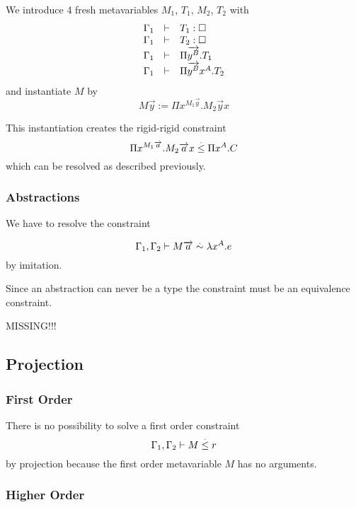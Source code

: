 We introduce 4 fresh metavariables $M_1$, $T_1$, $M_2$, $T_2$ with
$$
    \begin{array}{lllll} 
        \Gamma_1 &\vdash& T_1: {\Box}
        \\
        \Gamma_1 &\vdash& T_2: {\Box}
        \\
        \Gamma_1 &\vdash& \Pi {\overrightarrow {y^B}}. T_1
        \\
        \Gamma_1 &\vdash& \Pi {\overrightarrow {y^B}} x^A. T_2
     \end{array}
$$
and instantiate $M$ by
$$
    M \vec y := \Pi x^{M_1 \vec y}. M_2 \vec y x
$$

This instantiation creates the rigid-rigid constraint
$$
    \Pi x^{M_1 {\overrightarrow {a}}}. M_2 {\overrightarrow {a}} x
    \stackrel . \le
    \Pi x^A. C
$$
which can be resolved as described previously.








\subsubsection {Abstractions}




We have to resolve the constraint

$$
    \Gamma_1, \Gamma_2
    \vdash
    M {\overrightarrow {a}} \stackrel . \sim \lambda x^A. e
$$
by imitation.

Since an abstraction can never be a type the constraint must be an equivalence
constraint.


MISSING!!!








\subsection{Projection}


\subsubsection{First Order}

There is no possibility to solve a first order constraint
$$
    \Gamma_1, \Gamma_2 \vdash M \stackrel . \le r
$$
by projection because the first order metavariable $M$ has no arguments.




\subsubsection{Higher Order}

